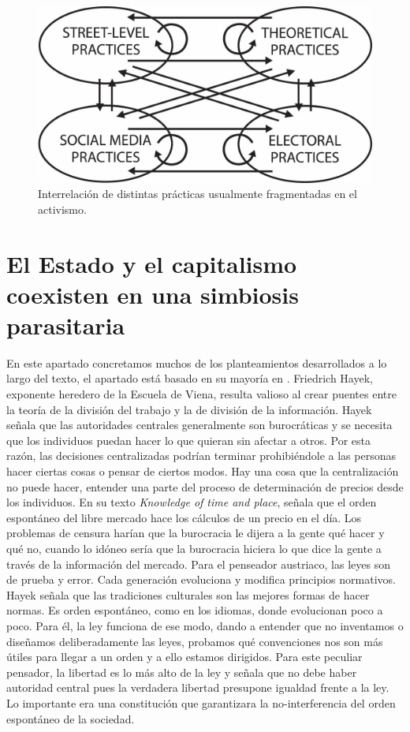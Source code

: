 \begin{figure}[htb]
  \centering
  \includegraphics[width=0.7\linewidth]{images/spheres-practices.png}
  \caption{Interrelación de distintas prácticas usualmente fragmentadas en el activismo.}
  \label{fig:spehres}
\end{figure}

\section{El Estado y el capitalismo coexisten en una simbiosis parasitaria}
\label{sub:el-estado-y-el-capitalismo-coexisten-en-una-simbiosis-parasitaria}

En este apartado concretamos muchos de los planteamientos desarrollados a lo largo del texto, el apartado está basado en su mayoría en \autocite{PeopleArePeople2018}.
Friedrich Hayek, exponente heredero de la Escuela de Viena, resulta valioso al crear puentes entre la teoría de la división del trabajo y la de división de la información. Hayek señala que las autoridades centrales generalmente son burocráticas y se necesita que los individuos puedan hacer lo que quieran sin afectar a otros. Por esta razón, las decisiones centralizadas podrían terminar prohibiéndole a las personas hacer ciertas cosas o pensar de ciertos modos. Hay una cosa que la centralización no puede hacer, entender una parte del proceso de determinación de precios desde los individuos. En su texto \emph{Knowledge of time and place}, señala que el orden espontáneo del libre mercado hace los cálculos de un precio en el día. Los problemas de censura harían que la burocracia le dijera a la gente qué hacer y qué no, cuando lo idóneo sería que la burocracia hiciera lo que dice la gente a través de la información del mercado. Para el penseador austriaco, las leyes son de prueba y error. Cada generación evoluciona y modifica principios normativos. Hayek señala que las tradiciones culturales son las mejores formas de hacer normas. Es orden espontáneo, como en los idiomas, donde evolucionan poco a poco. Para él, la ley funciona de ese modo, dando a entender que no inventamos o diseñamos deliberadamente las leyes, probamos qué convenciones nos son más útiles para llegar a un orden y a ello estamos dirigidos. Para este peculiar pensador, la libertad es lo más alto de la ley y señala que no debe haber autoridad central pues la verdadera libertad presupone igualdad frente a la ley. Lo importante era una constitución que garantizara la no-interferencia del orden espontáneo de la sociedad.

